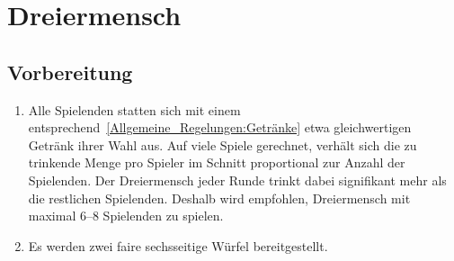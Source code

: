 \chapter{Dreiermensch}

\section{Vorbereitung}
\begin{enumerate}[label={(\arabic*)}]	
	\item
	Alle Spielenden statten sich mit einem entsprechend~\ref{Allgemeine_Regelungen:Getränke} etwa gleichwertigen Getränk ihrer Wahl aus.
	Auf viele Spiele gerechnet, verhält sich die zu trinkende Menge pro Spieler im Schnitt proportional zur Anzahl der Spielenden.
	Der Dreiermensch jeder Runde trinkt dabei signifikant mehr als die restlichen Spielenden.
	Deshalb wird empfohlen, Dreiermensch mit maximal 6--8 Spielenden zu spielen.
	
	\item
	Es werden zwei faire sechsseitige Würfel bereitgestellt.
\end{enumerate}

